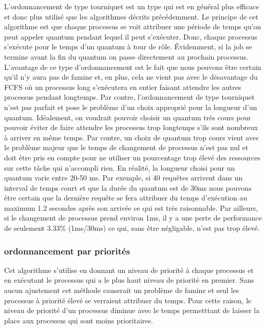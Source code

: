 \documentclass{article}
\begin{document}
L'ordonnancement de type tourniquet est un type qui est en général plus efficace et donc plus utilisé que les algorithmes décrits précédemment. Le principe de cet algorithme est que chaque processus se voit attribuer une période de temps qu'on peut appeler quantum pendant lequel il peut s'exécuter. Donc, chaque processus s'exécute pour le temps d'un quantum à tour de rôle. Évidemment, si la job se termine avant la fin du quantum on passe directement au prochain processus. L'avantage de ce type d'ordonnancement est le fait que nous pouvons être certain qu'il n'y aura pas de famine et, en plus, cela ne vient pas avec le désavantage du FCFS où un processus long s'exécutera en entier faisant attendre les autres processus pendant longtemps. Par contre, l'ordonnancement de type tourniquet n'est pas parfait et pose le problème d'un choix approprié pour la longueur d'un quantum. Idéalement, on voudrait pouvoir choisir un quantum très cours pour pouvoir éviter de faire attendre les processus trop longtemps s'ils sont nombreux à arriver en même temps. Par contre, un choix de quantum trop cours vient avec le problème majeur que le temps de changement de processus n'est pas nul et doit être pris en compte pour ne utiliser un pourcentage trop élevé des ressources sur cette tâche qui n'accompli rien.
\newline
\newline
En réalité, la longueur choisi pour un quantum varie entre 20-50 ms. Par exemple, si 40 requêtes arrivent dans un interval de temps court et que la durée du quantum est de 30ms nous pouvons être certain que la dernière requête se fera attribuer du temps d'exécution au maximum 1.2 secondes après son arrivée ce qui est très raisonnable. Par ailleurs, si le changement de processus prend environ 1ms, il y a une perte de performance de seulement 3.33\% (1ms/30ms) ce qui, sans être négligable, n'est pas trop élevé.

\subsubsection{ordonnancement par priorités}

Cet algorithme s'utilise en donnant un niveau de priorité à chaque processus et en exécutant le processus qui a le plus haut niveau de priorité en premier. Sans aucun ajustement cet méthode causerait un problème de famine et seul les processus à priorité élevé se verraient attribuer du temps. Pour cette raison, le niveau de priorité d'un processus diminue avec le temps permetttant de laisser la place aux processus qui sont moins prioritaires.
\end{document}

